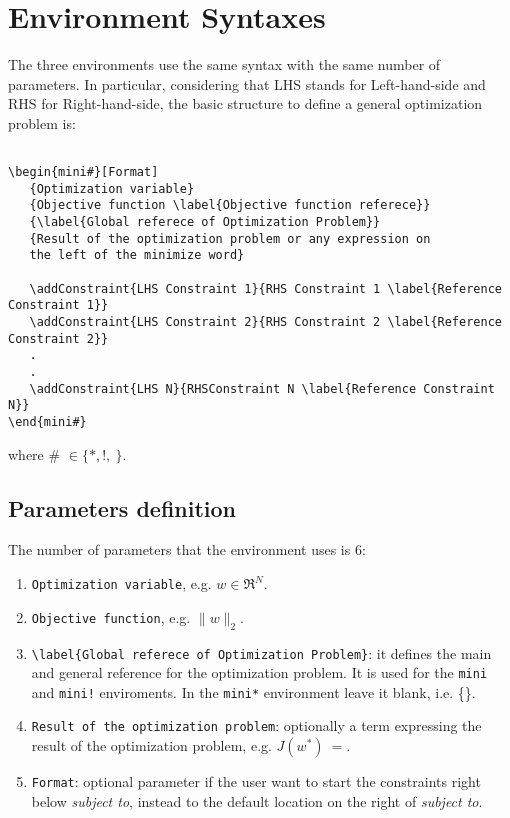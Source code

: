 \documentclass[]{report}
\begin{document}
\section{Environment Syntaxes}
The three environments use the same syntax with the same number of parameters. In particular, considering that LHS stands for Left-hand-side and RHS for Right-hand-side, the basic structure to define a general optimization problem is:
\begin{verbatim}

\begin{mini#}[Format]
   {Optimization variable}
   {Objective function \label{Objective function referece}}
   {\label{Global referece of Optimization Problem}}  
   {Result of the optimization problem or any expression on 
   the left of the minimize word}

   \addConstraint{LHS Constraint 1}{RHS Constraint 1 \label{Reference Constraint 1}}
   \addConstraint{LHS Constraint 2}{RHS Constraint 2 \label{Reference Constraint 2}}
   .
   .
   \addConstraint{LHS N}{RHSConstraint N \label{Reference Constraint N}}
\end{mini#}
\end{verbatim}

\noindent where \# $\in \{*, !, ~ \}$.
\subsection{Parameters definition}
The number of parameters that the environment uses is 6:

\begin{enumerate}
	\item \verb|Optimization variable|, e.g. $w \in \Re^N$.
	\item \verb|Objective function|, e.g. $\|w\|_2$.
	\item \verb|\label{Global referece of Optimization Problem}|: it defines the main and general reference for the optimization problem. It is used for the \verb|mini| and \verb|mini!| enviroments. In the \verb|mini*| environment leave it blank, i.e. \{\}.   
	\item \verb|Result of the optimization problem|: optionally a term expressing the result of the optimization problem, e.g. $J(w^*)~=$.
	\item \verb|Format|: optional parameter if the user want to start the constraints right below \textit{subject to}, instead to the default location on the right of \textit{subject to}.
\end{enumerate}
\end{document}
